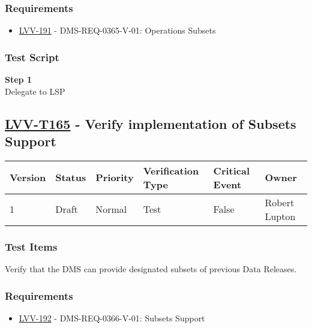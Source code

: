 \subsubsection{Requirements}\label{requirements-30}

\begin{itemize}
\tightlist
\item
  \href{https://jira.lsstcorp.org/browse/LVV-191}{LVV-191} -
  DMS-REQ-0365-V-01: Operations Subsets
\end{itemize}

\subsubsection{Test Script}\label{test-script-30}

\textbf{Step 1}\\
Delegate to LSP\\[2\baselineskip]

\hypertarget{lvv-t165---verify-implementation-of-subsets-support}{\subsection{\texorpdfstring{\href{https://jira.lsstcorp.org/secure/Tests.jspa\#/testCase/LVV-T165}{LVV-T165}
- Verify implementation of Subsets
Support}{LVV-T165 - Verify implementation of Subsets Support}}\label{lvv-t165---verify-implementation-of-subsets-support}}

\begin{longtable}[]{@{}llllll@{}}
\toprule
Version & Status & Priority & Verification Type & Critical Event &
Owner\tabularnewline
\midrule
\endhead
1 & Draft & Normal & Test & False & Robert Lupton\tabularnewline
\bottomrule
\end{longtable}

\subsubsection{Test Items}\label{test-items-31}

Verify that the DMS can provide designated subsets of previous Data
Releases.

\subsubsection{Requirements}\label{requirements-31}

\begin{itemize}
\tightlist
\item
  \href{https://jira.lsstcorp.org/browse/LVV-192}{LVV-192} -
  DMS-REQ-0366-V-01: Subsets Support
\end{itemize}


